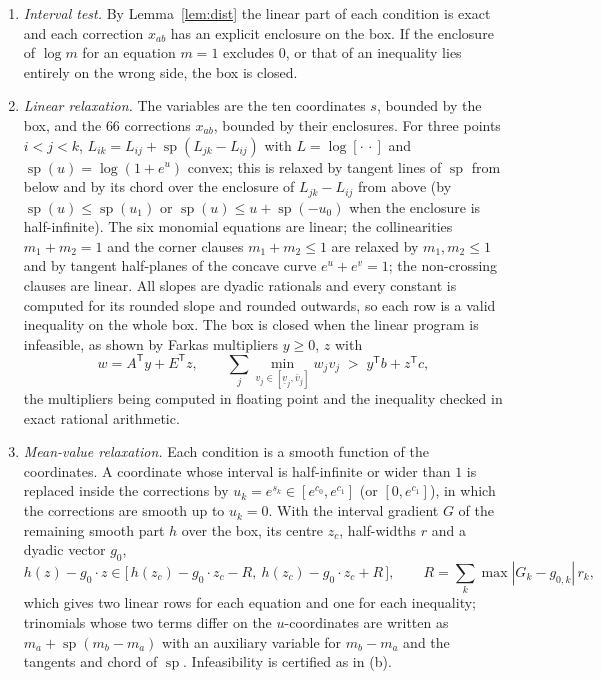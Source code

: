 \documentclass[11pt,a4paper]{article}
\theoremstyle{definition}
\theoremstyle{remark}
\newcommand{\br}[2]{[#1\,#2]}
\newcommand{\softplus}{\operatorname{sp}}
\begin{document}
\begin{enumerate}[label=(\alph*),leftmargin=2em]
\item \emph{Interval test.} By Lemma~\ref{lem:dist} the linear part of each condition is exact and each
correction $x_{ab}$ has an explicit enclosure on the box. If the enclosure of $\log m$ for an equation
$m = 1$ excludes $0$, or that of an inequality lies entirely on the wrong side, the box is closed.

\item \emph{Linear relaxation.} The variables are the ten coordinates $s$, bounded by the box, and the
$66$ corrections $x_{ab}$, bounded by their enclosures. For three points $i < j < k$,
$L_{ik} = L_{ij} + \softplus(L_{jk} - L_{ij})$ with $L = \log \br{\cdot}{\cdot}$ and
$\softplus(u) = \log(1 + e^u)$ convex; this is relaxed by tangent lines of $\softplus$ from below and by its chord over
the enclosure of $L_{jk} - L_{ij}$ from above (by $\softplus(u) \le \softplus(u_1)$ or $\softplus(u) \le u + \softplus(-u_0)$ when
the enclosure is half-infinite). The six monomial equations are linear; the collinearities
$m_1 + m_2 = 1$ and the corner clauses $m_1 + m_2 \le 1$ are relaxed by $m_1, m_2 \le 1$ and by tangent
half-planes of the concave curve $e^{u} + e^{v} = 1$; the non-crossing clauses are linear. All slopes are
dyadic rationals and every constant is computed for its rounded slope and rounded outwards, so each row is
a valid inequality on the whole box. The box is closed when the linear program is infeasible, as shown by
Farkas multipliers $y \ge 0$, $z$ with
\[
  w = A^{\mathsf T} y + E^{\mathsf T} z,\qquad
  \sum_j \min_{v_j \in [\underline v_j, \overline v_j]} w_j v_j \;>\; y^{\mathsf T} b + z^{\mathsf T} c,
\]
the multipliers being computed in floating point \cite{HiGHS} and the inequality checked in exact
rational arithmetic.

\item \emph{Mean-value relaxation.} Each condition is a smooth function of the coordinates. A coordinate
whose interval is half-infinite or wider than $1$ is replaced inside the corrections by
$u_k = e^{s_k} \in [e^{c_0}, e^{c_1}]$ (or $[0, e^{c_1}]$), in which the corrections are smooth up to
$u_k = 0$. With the interval gradient $G$ of the remaining smooth part $h$ over the box, its centre
$z_c$, half-widths $r$ and a dyadic vector $g_0$,
\[
h(z) - g_0 \cdot z \in \bigl[\,h(z_c) - g_0\cdot z_c - R,\ h(z_c) - g_0\cdot z_c + R\,\bigr],\qquad
R = \sum_k \max|G_k - g_{0,k}|\,r_k,
\]
which gives two linear rows for each equation and one for each inequality; trinomials whose two terms
differ on the $u$-coordinates are written as $m_a + \softplus(m_b - m_a)$ with an auxiliary variable for
$m_b - m_a$ and the tangents and chord of $\softplus$. Infeasibility is certified as in (b).


\end{enumerate}
\end{document}
